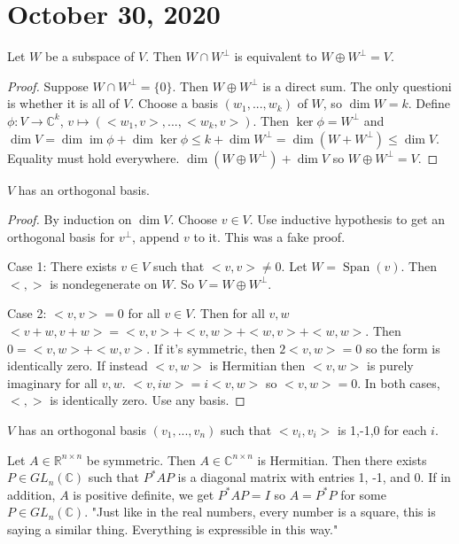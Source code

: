 \documentclass{article}
\newcommand{\C}{\mathbb{C}}
\newcommand{\R}{\mathbb{R}}
\newcommand{\ra}[1][]{\xrightarrow{#1}}
\DeclareMathOperator{\im}{im}
\DeclareMathOperator{\Span}{Span}
\begin{document}
\section{October 30, 2020}
\begin{theorem}
Let $W$ be a subspace of $V$. Then $W\cap W^\perp$ is equivalent to $W\oplus W^\perp=V$.
\end{theorem}
\begin{proof}
Suppose $W\cap W^\perp=\{0\}$. Then $W\oplus W^\perp$ is a direct sum. The only questioni is whether it is all of $V$. Choose a basis $(w_1,...,w_k)$ of $W$, so $\dim W=k$. Define $\phi:V\ra \C^k$, $v\mapsto (<w_1,v>,...,<w_k,v>)$. Then $\ker\phi=W^\perp$ and $\dim V=\dim\im\phi+\dim\ker\phi\leq k+\dim W^\perp =\dim (W+W^\perp)\leq \dim V$. Equality must hold everywhere. $\dim(W\oplus W^\perp)+\dim V$ so $W\oplus W^\perp=V$.
\end{proof}
\begin{theorem}
$V$ has an orthogonal basis.
\end{theorem}
\begin{proof}
By induction on $\dim V$. Choose $v\in V$. Use inductive hypothesis to get an orthogonal basis for $v^\perp$, append $v$ to it. This was a fake proof.

Case 1: There exists $v\in V$ such that $<v,v>\neq 0$. Let $W=\Span(v)$. Then $<,>$ is nondegenerate on $W$. So $V=W\oplus W^\perp$. 

Case 2: $<v,v>=0$ for all $v\in V$. Then for all $v,w$ $<v+w,v+w>=<v,v>+<v,w>+<w,v>+<w,w>$. Then $0=<v,w>+<w,v>$. If it's symmetric, then $2<v,w>=0$ so the form is identically zero. If instead $<v,w>$ is Hermitian then $<v,w>$ is purely imaginary for all $v,w$. $<v,iw>=i<v,w>$ so $<v,w>=0$. In both cases, $<,>$ is identically zero. Use any basis.
\end{proof}
\begin{corollary}
$V$ has an orthogonal basis $(v_1,...,v_n)$ such that $<v_i,v_i>$ is 1,-1,0 for each $i$. 
\end{corollary}
\begin{corollary}
Let $A\in \R^{n\times n}$ be symmetric. Then $A\in \C^{n\times n}$ is Hermitian. Then there exists $P\in GL_n(\C)$ such that $P^*AP$ is a diagonal matrix with entries 1, -1, and 0. If in addition, $A$ is positive definite, we get $P^*AP=I$ so $A=P^*P$ for some $P\in GL_n(\C)$. "Just like in the real numbers, every number is a square, this is saying a similar thing. Everything is expressible in this way." 
\end{corollary}
\end{document}
